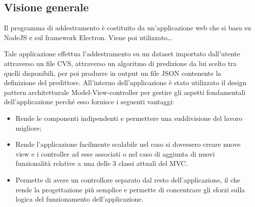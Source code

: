 \documentclass[../manuale-sviluppatore.tex]{subfiles}
\begin{document}
\subsection{Visione generale}%
\label{subs:installazione_applicazione_di_addestramento}
Il programma di addestramento è costituito da un'applicazione web che si basu su NodeJS e sul framework Electron. Viene poi utilizzato\dots

Tale applicazione effettua l'addestramento su un dataset importato dall'utente attraverso un file CVS, attraverso un algoritmo di predizione da lui scelto tra quelli disponibili, per poi produrre in output
un file JSON contenente la definizione del predittore.
All'interno dell'applicazione è stato utilizzato il design pattern architetturale Model-View-controller per gestire gli aspetti fondamentali dell'applicazione perché esso fornisce i seguenti vantaggi:
\begin{itemize}
    \item Rende le componenti indipendenti e permettere una suddivisione del lavoro migliore;
    \item Rende l'applicazione facilmente scalabile nel caso si dovessero creare nuove view e i controller ad esse associati o nel caso di aggiunta di nuovi funzionalità relative a una delle 3 classi attuali del MVC.
    \item Permette di avere un controllore separato dal resto dell’applicazione, il che rende la progettazione più semplice e permette di concentrare gli sforzi sulla logica del funzionamento dell'applicazione.
\end{itemize}
\end{document}
